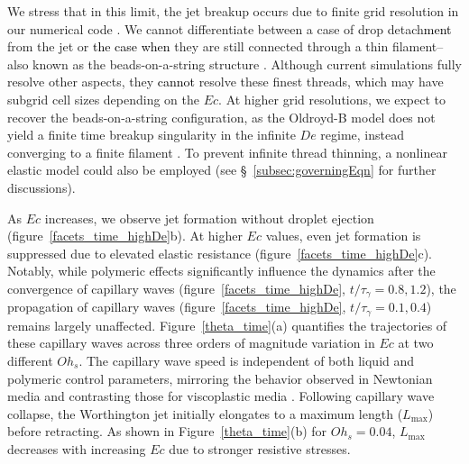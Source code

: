 \documentclass{jfm}
\newcommand{\DL}[1]{{\textcolor{black}{#1}}}
\begin{document}
We stress that in this limit, the jet breakup occurs due to finite grid resolution in our numerical code \citep{lohse-2020-pnas,chirco2022manifold,kant2023bag}. We cannot differentiate between a case of drop detach\DL{ment} from the jet or \DL{the case when} they are still connected through a thin filament--also known as the beads-on-a-string structure \citep{hosokawa2023phase, clasen2006beads, pandey2021elastic, zinelis2023transition}.
Although current simulations fully resolve other aspects, they \DL{cannot} resolve these finest threads, which may have subgrid cell sizes depending on the $Ec$.
At higher grid resolutions, we expect to recover the beads-on-a-string configuration, as the Oldroyd-B model does not yield a finite time breakup singularity in the infinite $De$ regime, instead converging to a finite filament \citep{eggers2020self,turkoz2018axisymmetric,turkoz2021simulation}.
To prevent infinite thread thinning, a nonlinear elastic model could also be employed (see \S~\ref{subsec:governingEqn} for further discussions).

As $Ec$ increases, we observe jet formation without droplet ejection (figure~\ref{facets_time_highDe}b). At higher $Ec$ values, even jet formation is suppressed due to elevated elastic resistance (figure~\ref{facets_time_highDe}c).
Notably, while polymeric effects significantly influence the dynamics after the convergence of capillary waves (figure~\ref{facets_time_highDe}, $t/\tau_\gamma = 0.8, 1.2$), the propagation of capillary waves (figure~\ref{facets_time_highDe}, $t/\tau_\gamma = 0.1, 0.4$) remains largely unaffected. Figure~\ref{theta_time}(a) quantifies the trajectories of these capillary waves across three orders of magnitude variation in $Ec$ at two different $Oh_s$. The capillary wave speed is independent of both liquid and polymeric control parameters, mirroring the behavior observed in Newtonian media \citep{gordillo2019capillary} and contrasting those for viscoplastic media \citep{sanjay-2022-JFM}.
Following capillary wave collapse, the Worthington jet initially elongates to a maximum length ($L_{\text{max}}$) before retracting. As shown in Figure~\ref{theta_time}(b) for $Oh_s = 0.04$, $L_{\text{max}}$ decreases with increasing $Ec$ due to stronger resistive stresses.
\end{document}
